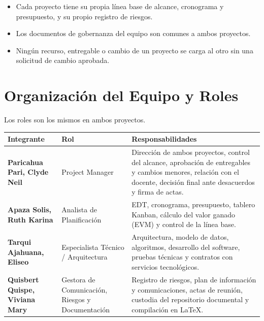 \documentclass[11pt,a4paper]{article}
\begin{document}
\begin{itemize}[leftmargin=*]
    \item Cada proyecto tiene su propia línea base de alcance, cronograma y presupuesto, y su propio registro de riesgos.
    \item Los documentos de gobernanza del equipo son comunes a ambos proyectos.
    \item Ningún recurso, entregable o cambio de un proyecto se carga al otro sin una solicitud de cambio aprobada.
\end{itemize}

\section{Organización del Equipo y Roles}
Los roles son los mismos en ambos proyectos.

\vspace{0.1cm}
{\small
\noindent\begin{tabularx}{\textwidth}{@{}P{3.9cm} P{3.4cm} L@{}}
\toprule
{}
\textbf{Integrante} & \textbf{Rol} & \textbf{Responsabilidades} \\
\midrule
\textbf{Paricahua Pari, Clyde Neil} & Project Manager & Dirección de ambos proyectos, control del alcance, aprobación de entregables y cambios menores, relación con el docente, decisión final ante desacuerdos y firma de actas. \\
\addlinespace[3pt]
\textbf{Apaza Solis, Ruth Karina} & Analista de Planificación & EDT, cronograma, presupuesto, tablero Kanban, cálculo del valor ganado (EVM) y control de la línea base. \\
\addlinespace[3pt]
\textbf{Tarqui Ajahuana, Eliseo} & Especialista Técnico / Arquitectura & Arquitectura, modelo de datos, algoritmos, desarrollo del software, pruebas técnicas y contratos con servicios tecnológicos. \\
\addlinespace[3pt]
\textbf{Quisbert Quispe, Viviana Mary} & Gestora de Comunicación, Riesgos y Documentación & Registro de riesgos, plan de información y comunicaciones, actas de reunión, custodia del repositorio documental y compilación en \LaTeX. \\
\bottomrule
\end{tabularx}
}
\end{document}
